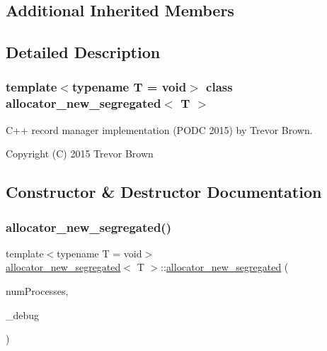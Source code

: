 \subsection*{Additional Inherited Members}


\subsection{Detailed Description}
\subsubsection*{template$<$typename T = void$>$\newline
class allocator\+\_\+new\+\_\+segregated$<$ T $>$}

C++ record manager implementation (P\+O\+DC 2015) by Trevor Brown.

Copyright (C) 2015 Trevor Brown 

\subsection{Constructor \& Destructor Documentation}
\mbox{\label{classallocator__new__segregated_ae05ebf7ffd3a4939e36d2a82f495a30c}} 
\subsubsection{\texorpdfstring{allocator\+\_\+new\+\_\+segregated()}{allocator\_new\_segregated()}}
{\footnotesize\ttfamily template$<$typename T  = void$>$ \\
\hyperlink{classallocator__new__segregated}{allocator\+\_\+new\+\_\+segregated}$<$ T $>$\+::\hyperlink{classallocator__new__segregated}{allocator\+\_\+new\+\_\+segregated} (\begin{DoxyParamCaption}\item[{const int}]{num\+Processes,  }\item[{\hyperlink{classdebugInfo}{debug\+Info} $\ast$const}]{\+\_\+debug }\end{DoxyParamCaption})\hspace{0.3cm}{\ttfamily [inline]}}

